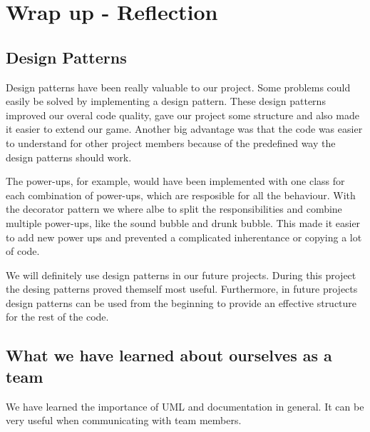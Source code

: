 \documentclass[a4paper]{article}
\begin{document}


\section{Wrap up - Reflection}

\subsection{Design Patterns}
Design patterns have been really valuable to our project. Some problems could easily be solved by implementing a design pattern. These design patterns improved our overal code quality, gave our project some structure and also made it easier to extend our game. Another big advantage was that the code was easier to understand for other project members because of the predefined way the design patterns should work.

The power-ups, for example, would have been implemented with one class for each combination of power-ups, which are resposible for all the behaviour. With the decorator pattern we where albe to split the responsibilities and combine multiple power-ups, like the sound bubble and drunk bubble. This made it easier to add new power ups and prevented a complicated inherentance or copying a lot of code.

We will definitely use design patterns in our future projects. During this project the desing patterns proved themself most useful. Furthermore, in future projects design patterns can be used from the beginning to provide an effective structure for the rest of the code.

\subsection{What we have learned about ourselves as a team}
We have learned the importance of UML and documentation in general. It can be very useful when communicating with team members.
\end{document}
